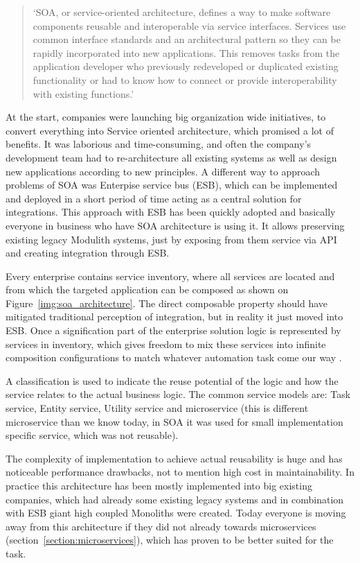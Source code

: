 \begin{quote}
    `SOA, or service-oriented architecture, defines a way to make software components reusable and interoperable via service interfaces. Services use common interface standards and an architectural pattern so they can be rapidly incorporated into new applications. This removes tasks from the application developer who previously redeveloped or duplicated existing functionality or had to know how to connect or provide interoperability with existing functions.' \cite{IBM_SOA}
\end{quote}

At the start, companies were launching big organization wide initiatives, to convert everything into Service oriented architecture, which promised a lot of benefits. It was laborious and time-consuming, and often the company's development team had to re-architecture all existing systems as well as design new applications according to new principles. A different way to approach problems of SOA was Enterpise service bus (ESB), which can be implemented and deployed in a short period of time acting as a central solution for integrations. This approach with ESB has been quickly adopted and basically everyone in business who have SOA architecture is using it. It allows preserving existing legacy Modulith systems, just by exposing from them service via API and creating integration through ESB.

Every enterprise contains service inventory, where all services are located and from which the targeted application can be composed as shown on Figure~\ref{img:soa_architecture}. The direct composable property should have mitigated traditional perception of integration, but in reality it just moved into ESB. Once a signification part of the enterprise solution logic is represented by services in inventory, which gives freedom to mix these services into infinite composition configurations to match whatever automation task come our way \cite{SERVICE_ORIENTED_ARCHITECTURE}.

A classification is used to indicate the reuse potential of the logic and how the service relates to the actual business logic. The common service models are: Task service, Entity service, Utility service and microservice (this is different microservice than we know today, in SOA it was used for small implementation specific service, which was not reusable). \cite{SERVICE_ORIENTED_ARCHITECTURE}

The complexity of implementation to achieve actual reusability is huge and has noticeable performance drawbacks, not to mention high cost in maintainability. In practice this architecture has been mostly implemented into big existing companies, which had already some existing legacy systems and in combination with ESB giant high coupled Monoliths were created. Today everyone is moving away from this architecture if they did not already towards microservices (section~\ref{section:microservices}), which has proven to be better suited for the task.


